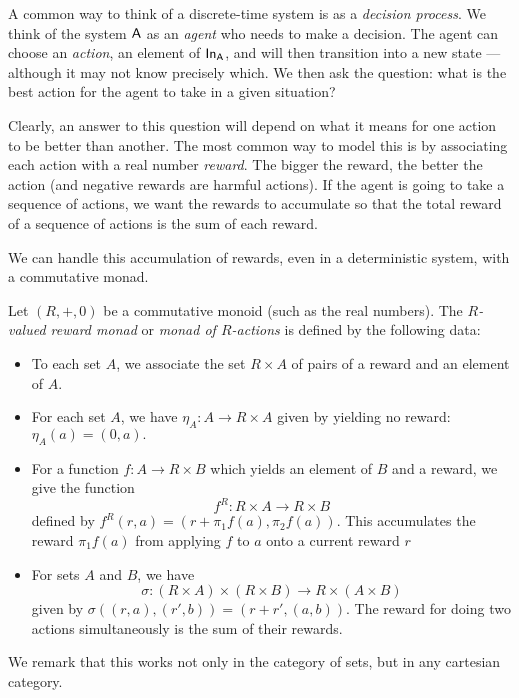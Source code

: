 \documentclass[DynamicalBook]{subfiles}
\begin{document}
A common way to think of a discrete-time system is as a \emph{decision process}. We
think of the system $\mathsf{A}$ as an \emph{agent} who needs to make a decision.
The agent can choose an \emph{action}, an element of $\mathsf{In}_{\mathsf{A}}$, and will then
transition into a new state --- although it may not know precisely which. We
then ask the question: what is the best action for the agent to take in a given
situation?

Clearly, an answer to this question will depend on what it means for one action
to be better than another. The most common way to model this is by associating
each action with a real number \emph{reward}. The bigger the reward, the better
the action (and negative rewards are harmful actions). If the agent is going to
take a sequence of actions, we want the rewards to accumulate so that the total
reward of a sequence of actions is the sum of each reward.

We can handle this accumulation of rewards, even in a deterministic system, with
a commutative monad.

\begin{definition}
Let $(R, +, 0)$ be a commutative monoid (such as the real numbers). The
\emph{$R$-valued reward monad} or \emph{monad of $R$-actions} is defined by the
following data:
\begin{itemize}
  \item To each set $A$, we associate the set $R \times A$ of pairs of a reward
    and an element of $A$.
  \item For each set $A$, we have $\eta_A : A \to R \times A$ given by yielding
    no reward:
    $\eta_A(a) = (0, a).$
  \item For a function $f : A \to R \times B$ which yields an element of $B$ and
    a reward, we give the function
    \[
      f^R : R \times A \to R \times B
    \]
 defined by $f^R(r, a) = (r + \pi_1f(a), \pi_2f(a))$. This accumulates the
 reward $\pi_1f(a)$ from applying $f$ to $a$ onto a current reward $r$
\item For sets $A$ and $B$, we have
  \[
\sigma : (R \times A) \times (R \times B) \to R \times (A \times B)
\]
given by $\sigma((r, a), (r', b)) = (r + r', (a, b))$. The reward for doing two
actions simultaneously is the sum of their rewards.
  \end{itemize}
  
We remark that this works not only in the category of sets, but in any cartesian category.
\end{definition}
\end{document}
